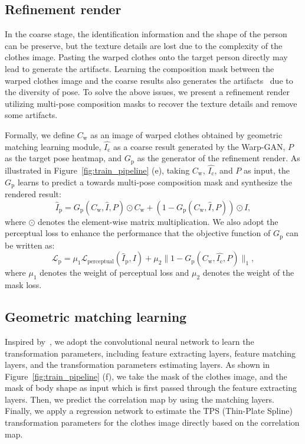 \documentclass[10pt,twocolumn,letterpaper]{article}
\begin{document}
\subsection{Refinement render}
\label{s:rr}
In the coarse stage, the identification information and the shape of the person can be preserve, but the texture details are lost due to the complexity of the clothes image. Pasting the warped clothes onto the target person directly may lead to generate the artifacts. Learning the composition mask between the warped clothes image and the coarse results also generates the artifacts~\cite{han2017viton,wang2018cpvton} due to the diversity of pose. To solve the above issues, we present a refinement render utilizing multi-pose composition masks to recover the texture
details and remove some artifacts.

Formally, we define $C_{\text{w}}$ as an image of warped clothes obtained by geometric matching learning module, $\hat{I_{\text{c}}}$ as a coarse result generated by the Warp-GAN, $P$ as the target pose heatmap, and $G_{\text{p}}$ as the generator of the refinement render. As illustrated in Figure~\ref{fig:train_pipeline} (e), taking $C_{\text{w}}$, $\hat{I_{\text{c}}}$, and $P$ as input, the $G_{\text{p}}$ learns to predict a towards multi-pose composition mask and synthesize the rendered result:
\begin{equation}
\hat{I}_{\text{p}} = G_{\text{p}}(C_{\text{w}}, \hat{I}, P) \odot C_{\text{w}} + (1 - G_{\text{p}}(C_{\text{w}}, \hat{I}, P)) \odot \hat{I},
\end{equation}
where $\odot$ denotes the element-wise matrix multiplication. We also adopt the perceptual loss to enhance the performance that the objective function of $G_{\text{p}}$ can be written as:
\begin{equation}
\mathcal{L}_{\text{p}} = \mu_{1} \mathcal{L}_{\text{perceptual}}(\hat{I}_{\text{p}}, I) + \mu_{2} \| 1 - G_{\text{p}}(C_{\text{w}}, \hat{I_{\text{c}}}, P)  \|_{1},
\end{equation}
where $\mu_{1}$ denotes the weight of perceptual loss and $\mu_{2}$ denotes the weight of the mask loss.

\subsection{Geometric matching learning}
\label{s:gml}
Inspired by~\cite{Rocco2017geocnn}, we adopt the convolutional neural network to learn the transformation parameters, including feature extracting layers, feature matching layers, and the transformation parameters estimating layers. As shown in Figure~\ref{fig:train_pipeline} (f), we take the mask of the clothes image, and the mask of body shape as input which is first passed through the feature extracting layers. Then, we predict the correlation map by using the matching layers. Finally, we apply a regression network to estimate the TPS (Thin-Plate Spline)~\cite{bookstein1989tps} transformation parameters for the clothes image directly based on the correlation map. 
\end{document}
